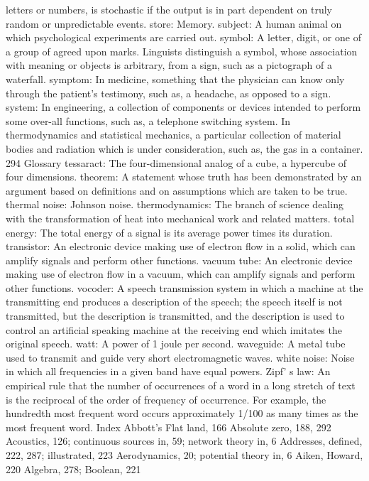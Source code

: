 {{{{{{{{{{{{{{{letters or numbers, is stochastic if the output is in part dependent
on truly random or unpredictable events.
store: Memory.
subject: A human animal on which psychological experiments are carried
out.
symbol: A letter, digit, or one of a group of agreed upon marks. Linguists
distinguish a symbol, whose association with meaning or objects
is arbitrary, from a sign, such as a pictograph of a waterfall.
symptom: In medicine, something that the physician can know only
through the patient’s testimony, such as, a headache, as opposed
to a sign.
system: In engineering, a collection of components or devices intended
to perform some over-all functions, such as, a telephone switching
system. In thermodynamics and statistical mechanics, a particular
collection of material bodies and radiation which is under consideration,
such as, the gas in a container.
294 Glossary
tessaract: The four-dimensional analog of a cube, a hypercube of four
dimensions.
theorem: A statement whose truth has been demonstrated by an argument
based on definitions and on assumptions which are taken to
be true.
thermal noise: Johnson noise.
thermodynamics: The branch of science dealing with the transformation
of heat into mechanical work and related matters.
total energy: The total energy of a signal is its average power times its
duration.
transistor: An electronic device making use of electron flow in a solid,
which can amplify signals and perform other functions.
vacuum tube: An electronic device making use of electron flow in a
vacuum, which can amplify signals and perform other functions.
vocoder: A speech transmission system in which a machine at the transmitting
end produces a description of the speech; the speech itself
is not transmitted, but the description is transmitted, and the
description is used to control an artificial speaking machine at the
receiving end which imitates the original speech.
watt: A power of 1 joule per second.
waveguide: A metal tube used to transmit and guide very short electromagnetic
waves.
white noise: Noise in which all frequencies in a given band have equal
powers.
Zipf’
s law: An empirical rule that the number of occurrences of a word
in a long stretch of text is the reciprocal of the order of frequency
of occurrence. For example, the hundredth most frequent word
occurs approximately 1/100 as many times as the most frequent
word.
Index
Abbott’s Flat land, 166
Absolute zero, 188, 292
Acoustics, 126; continuous sources in,
59; network theory in, 6
Addresses, defined, 222, 287; illustrated,
223
Aerodynamics, 20; potential theory in, 6
Aiken, Howard, 220
Algebra, 278; Boolean, 221
}}}}}}}}}}}}}}}
